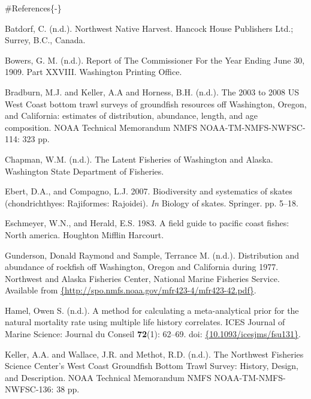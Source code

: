 \documentclass[12pt,]{article}
\begin{document}
\color{black}

\#References\{-\}

\renewcommand{\thepage}{}

\hypertarget{refs}{}
\leavevmode\hypertarget{ref-Batdorf1990}{}%
Batdorf, C. (n.d.). Northwest Native Harvest. Hancock House Publishers
Ltd.; Surrey, B.C., Canada.

\leavevmode\hypertarget{ref-Bowers1904}{}%
Bowers, G. M. (n.d.). Report of The Commissioner For the Year Ending
June 30, 1909. Part XXVIII. Washington Printing Office.

\leavevmode\hypertarget{ref-Bradburn2011}{}%
Bradburn, M.J. and Keller, A.A and Horness, B.H. (n.d.). The 2003 to
2008 US West Coast bottom trawl surveys of groundfish resources off
Washington, Oregon, and California: estimates of distribution,
abundance, length, and age composition. NOAA Technical Memorandum NMFS
NOAA-TM-NMFS-NWFSC-114: 323 pp.

\leavevmode\hypertarget{ref-Chapman1942}{}%
Chapman, W.M. (n.d.). The Latent Fisheries of Washington and Alaska.
Washington State Department of Fisheries.

\leavevmode\hypertarget{ref-Ebert2007biodiversity}{}%
Ebert, D.A., and Compagno, L.J. 2007. Biodiversity and systematics of
skates (chondrichthyes: Rajiformes: Rajoidei). \emph{In} Biology of
skates. Springer. pp. 5--18.

\leavevmode\hypertarget{ref-Eschmeyer1983}{}%
Eschmeyer, W.N., and Herald, E.S. 1983. A field guide to pacific coast
fishes: North america. Houghton Mifflin Harcourt.

\leavevmode\hypertarget{ref-Gunderson1980}{}%
Gunderson, Donald Raymond and Sample, Terrance M. (n.d.). Distribution
and abundance of rockfish off Washington, Oregon and California during
1977. Northwest and Alaska Fisheries Center, National Marine Fisheries
Service. Available from
\href{\%7Bhttp://spo.nmfs.noaa.gov/mfr423-4/mfr423-42.pdf\%7D}{\{http://spo.nmfs.noaa.gov/mfr423-4/mfr423-42.pdf\}}.

\leavevmode\hypertarget{ref-Hamel2015}{}%
Hamel, Owen S. (n.d.). A method for calculating a meta-analytical prior
for the natural mortality rate using multiple life history correlates.
ICES Journal of Marine Science: Journal du Conseil \textbf{72}(1):
62--69. doi:
\href{https://doi.org/\%7B10.1093/icesjms/fsu131\%7D}{\{10.1093/icesjms/fsu131\}}.

\leavevmode\hypertarget{ref-Keller2017}{}%
Keller, A.A. and Wallace, J.R. and Methot, R.D. (n.d.). The Northwest
Fisheries Science Center's West Coast Groundfish Bottom Trawl Survey:
History, Design, and Description. NOAA Technical Memorandum NMFS
NOAA-TM-NMFS-NWFSC-136: 38 pp.
\end{document}
